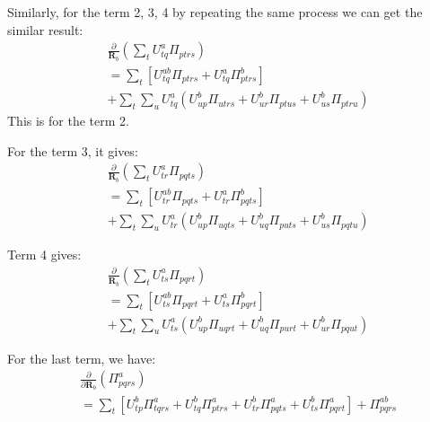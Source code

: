 Similarly, for the term 2, 3, 4 by repeating the same process we can get the
similar result:
\begin{align}
  \label{two_electron_MO_INT_gradient_eq:6}
&\frac{\partial}{\bm{R}_{b}} \left( \sum_{t}U^{a}_{tq}\Pi_{ptrs}\right)
\nonumber \\
&=\sum_{t}\left[ U^{ab}_{tq}\Pi_{ptrs} + U^{a}_{tq}\Pi^{b}_{ptrs}\right] 
\nonumber \\
&+ \sum_{t}\sum_{u}U^{a}_{tq}\left(
U^{b}_{up}\Pi_{utrs} + 
U^{b}_{ur}\Pi_{ptus} + 
U^{b}_{us}\Pi_{ptru}  
\right)
\end{align}
This is for the term 2.

For the term 3, it gives:
\begin{align}
  \label{two_electron_MO_INT_gradient_eq:7}
&\frac{\partial}{\bm{R}_{b}} \left( \sum_{t}U^{a}_{tr}\Pi_{pqts}\right)
\nonumber \\
&=\sum_{t}\left[ U^{ab}_{tr}\Pi_{pqts} + U^{a}_{tr}\Pi^{b}_{pqts}\right] 
\nonumber \\
&+ \sum_{t}\sum_{u}U^{a}_{tr}\left(
U^{b}_{up}\Pi_{uqts} + 
U^{b}_{uq}\Pi_{puts} + 
U^{b}_{us}\Pi_{pqtu}  
\right)
\end{align}

Term 4 gives:
\begin{align}
  \label{two_electron_MO_INT_gradient_eq:8}
&\frac{\partial}{\bm{R}_{b}} \left( \sum_{t}U^{a}_{ts}\Pi_{pqrt}\right)
\nonumber \\
&=\sum_{t}\left[ U^{ab}_{ts}\Pi_{pqrt} + U^{a}_{ts}\Pi^{b}_{pqrt}\right] 
\nonumber \\
&+ \sum_{t}\sum_{u}U^{a}_{ts}\left(
U^{b}_{up}\Pi_{uqrt} + 
U^{b}_{uq}\Pi_{purt} + 
U^{b}_{ur}\Pi_{pqut}  
\right)
\end{align}

For the last term, we have:
\begin{align}
 \label{two_electron_MO_INT_gradient_eq:9}
& \frac{\partial}{\partial\bm{R}_{b}}\left(\Pi^{a}_{pqrs}\right) \nonumber \\
&= \sum_{t}\left[ 
U^{b}_{tp}\Pi^{a}_{tqrs} +
U^{b}_{tq}\Pi^{a}_{ptrs} + 
U^{b}_{tr}\Pi^{a}_{pqts} + 
U^{b}_{ts}\Pi^{a}_{pqrt}  
\right] + \Pi^{ab}_{pqrs}
\end{align}

